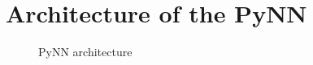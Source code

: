 \chapter{Architecture of the PyNN}
\begin{figure}[htb]
    \centering
    \begin{sideways}
        
    \end{sideways}
    \caption{PyNN architecture}
    \label{fig:pynn_arch}
\end{figure}